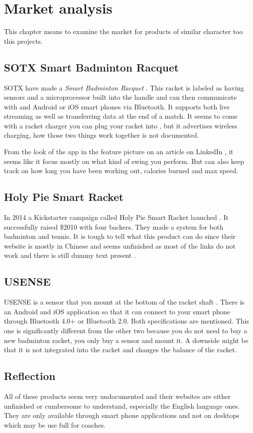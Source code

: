 \chapter{Market analysis}
This chapter means to examine the market for products of similar  character too this projects.

\section*{SOTX Smart Badminton Racquet}
SOTX have made a \textit{Smart Badminton Racquet} \citep{sotxsite}. This racket is labeled as having sensors and a microprocessor built into the handle and can then communicate with and Android or iOS smart phones via Bluetooth. It supports both live streaming as well as transferring data at the end of a match. It seems to come with a racket charger you can plug your racket into \cite{sotxhw}, but it advertises wireless charging, how those two things work together is not documented.

From the look of the app in the feature picture on an article on LinkedIn \citep{sotxapp}, it seems like it focus mostly on what kind of swing you perform. But can also keep track on how long you have been working out, calories burned and max speed.

\section*{Holy Pie Smart Racket}
In 2014 a Kickstarter campaign called Holy Pie Smart Racket launched \citep{holypie}. It successfully raised \$2010 with four backers. They made a system for both badminton and tennis. It is tough to tell what this product can do since their website is mostly in Chinese and seems unfinished as most of the links do not work and there is still dummy text present \citep{holypi}.

\section*{USENSE}
USENSE is a sensor that you mount at the bottom of the racket shaft \citep{usense}. There is an Android and iOS application so that it can connect to your smart phone through Bluetooth 4.0+ or Bluetooth 2.0. Both specifications are mentioned. This one is significantly different from the other two because you do not need to buy a new badminton racket, you only buy a sensor and mount it. A downside might be that it is not integrated into the racket and changes the balance of the racket.	

\section*{Reflection}
All of these products seem very undocumented and their websites are either unfinished or cumbersome to understand, especially the English language ones. They are only available through smart phone applications and not on desktops which may be use full for coaches.